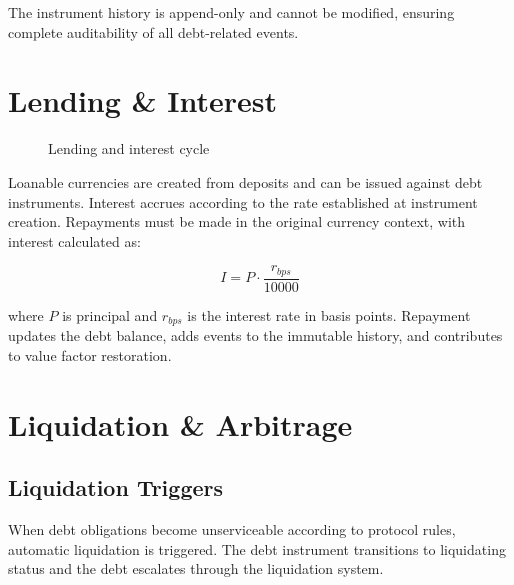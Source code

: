 \documentclass[11pt,a4paper]{article}
\begin{document}
The instrument history is append-only and cannot be modified, ensuring complete auditability of all debt-related events.

\section{Lending \& Interest}
\begin{figure}[H]
\centering
{}
\caption{Lending and interest cycle}
\label{fig:lending}
\end{figure}

Loanable currencies are created from deposits and can be issued against debt instruments. Interest accrues according to the rate established at instrument creation. Repayments must be made in the original currency context, with interest calculated as:

\begin{equation}
I = P \cdot \frac{r_{bps}}{10000}
\end{equation}

where $P$ is principal and $r_{bps}$ is the interest rate in basis points. Repayment updates the debt balance, adds events to the immutable history, and contributes to value factor restoration.

\section{Liquidation \& Arbitrage}
\subsection{Liquidation Triggers}
When debt obligations become unserviceable according to protocol rules, automatic liquidation is triggered. The debt instrument transitions to liquidating status and the debt escalates through the liquidation system.
\end{document}
